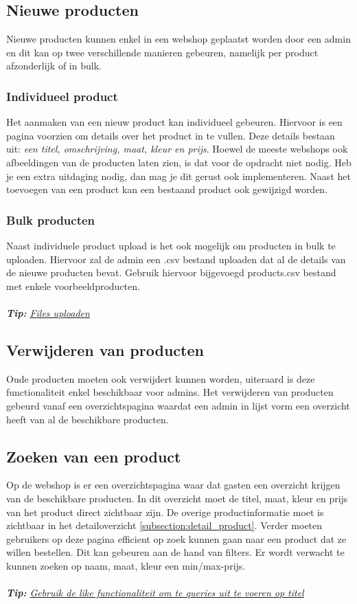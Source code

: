 \documentclass{article}
\begin{document}
\subsection{Nieuwe producten}
Nieuwe producten kunnen enkel in een webshop geplaatst worden door een admin en dit kan op twee verschillende manieren gebeuren, namelijk per product afzonderlijk of in bulk.

\subsubsection{Individueel product}
Het aanmaken van een nieuw product kan individueel gebeuren. Hiervoor is een pagina voorzien om details over het product in te vullen. Deze details bestaan uit: \textit{een titel, omschrijving, maat, kleur en prijs}. Hoewel de meeste webshops ook afbeeldingen van de producten laten zien, is dat voor de opdracht niet nodig. Heb je een extra uitdaging nodig, dan mag je dit gerust ook implementeren. Naast het toevoegen van een product kan een bestaand product ook gewijzigd worden.

\subsubsection{Bulk producten}
\label{subsection:bulk_producten}
Naast individuele product upload is het ook mogelijk om producten in bulk te uploaden. Hiervoor zal de admin een .csv bestand uploaden dat al de details van de nieuwe producten bevat. Gebruik hiervoor bijgevoegd products.csv bestand met enkele voorbeeldproducten.
\\
\\
\textit{\textbf{Tip:} \href{https://phoenixframework.readme.io/v0.14.0/docs/file-uploads}{Files uploaden}}


\subsection{Verwijderen van producten}
Oude producten moeten ook verwijdert kunnen worden, uiteraard is deze functionaliteit enkel beschikbaar voor admins. Het verwijderen van producten gebeurd vanaf een overzichtspagina waardat een admin in lijst vorm een overzicht heeft van al de beschikbare producten.

\subsection{Zoeken van een product}
\label{subsection:zoeken_van_een_product}
Op de webshop is er een overzichtspagina waar dat gasten een overzicht krijgen van de beschikbare producten. In dit overzicht moet de titel, maat, kleur en prijs van het product direct zichtbaar zijn. De overige productinformatie moet is zichtbaar in het detailoverzicht \ref{subsection:detail_product}. Verder moeten gebruikers op deze pagina efficient op zoek kunnen gaan naar een product dat ze willen bestellen. Dit kan gebeuren aan de hand van filters. Er wordt verwacht te kunnen zoeken op naam, maat, kleur een min/max-prijs. 
\\
\\
\textit{\textbf{Tip:} \href{https://hexdocs.pm/ecto/Ecto.Query.API.html}{Gebruik de like functionaliteit om te queries uit te voeren op titel}}
\end{document}
